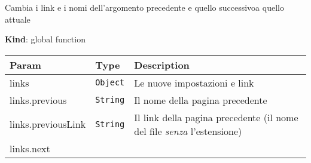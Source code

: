 Cambia i link e i nomi dell'argomento precedente e quello successivoa
quello attuale

\textbf{Kind}: global function

\begin{longtabu} to \textwidth {X[1,L,m]X[1,L,m]X[1.5,L,m]}
\toprule
\begin{minipage}[b]{0.30\columnwidth}\raggedright
Param\strut
\end{minipage} & \begin{minipage}[b]{0.30\columnwidth}\raggedright
Type\strut
\end{minipage} & \begin{minipage}[b]{0.30\columnwidth}\raggedright
Description\strut
\end{minipage}\tabularnewline
\midrule
\endhead
\begin{minipage}[t]{0.30\columnwidth}\raggedright
links\strut
\end{minipage} & \begin{minipage}[t]{0.30\columnwidth}\raggedright
\texttt{Object}\strut
\end{minipage} & \begin{minipage}[t]{0.30\columnwidth}\raggedright
Le nuove impostazioni e link\strut
\end{minipage}\tabularnewline
\begin{minipage}[t]{0.30\columnwidth}\raggedright
links.previous\strut
\end{minipage} & \begin{minipage}[t]{0.30\columnwidth}\raggedright
\texttt{String}\strut
\end{minipage} & \begin{minipage}[t]{0.30\columnwidth}\raggedright
Il nome della pagina precedente\strut
\end{minipage}\tabularnewline
\begin{minipage}[t]{0.30\columnwidth}\raggedright
links.previousLink\strut
\end{minipage} & \begin{minipage}[t]{0.30\columnwidth}\raggedright
\texttt{String}\strut
\end{minipage} & \begin{minipage}[t]{0.30\columnwidth}\raggedright
Il link della pagina precedente (il nome del file \emph{senza}
l'estensione)\strut
\end{minipage}\tabularnewline
\begin{minipage}[t]{0.30\columnwidth}\raggedright
links.next\strut
\end{minipage} & \begin{minipage}[t]{0.30\columnwidth}\raggedright

\end{minipage}
\end{longtabu}
